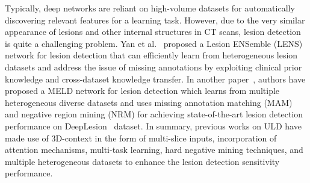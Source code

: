\documentclass{bmvc2k}
\begin{document}
Typically, deep networks are reliant on high-volume datasets for automatically discovering relevant features for a learning task. However, due to the very similar appearance of lesions and other internal structures in CT scans, lesion detection is quite a challenging problem. Yan et al.~\cite{yan2020universal} proposed a Lesion ENSemble (LENS) network for lesion detection that can efficiently learn from heterogeneous lesion datasets and address the issue of missing annotations by exploiting clinical prior knowledge and cross-dataset knowledge transfer. In another paper~\cite{meld}, authors have proposed a MELD network for lesion detection which learns from multiple heterogeneous diverse datasets and uses missing annotation matching (MAM) and negative region mining (NRM) for achieving state-of-the-art lesion detection performance on DeepLesion~\cite{yan2018deeplesion} dataset. In summary, previous works on ULD have made use of 3D-context in the form of multi-slice inputs, incorporation of attention mechanisms, multi-task learning, hard negative mining techniques, and multiple heterogeneous datasets to enhance the lesion detection sensitivity performance. 
\end{document}
